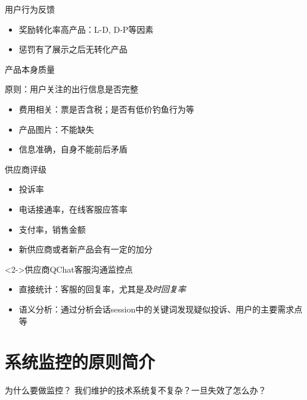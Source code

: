 \documentclass[handout]{beamer}
\begin{document}
\begin{CJK}{UTF8}{gbsn}
\begin{frame}{用户行为反馈}
  \begin{itemize}
  \item {奖励转化率高产品：L-D, D-P等因素}
  \item {惩罚有了展示之后无转化产品}
  \end{itemize}
\end{frame}

\begin{frame}{产品本身质量}
  \begin{block}{原则：用户关注的出行信息是否完整}
    \begin{itemize}
    \item {费用相关：票是否含税；是否有低价钓鱼行为等}
    \item {产品图片：不能缺失}
    \item {信息准确，自身不能前后矛盾}
    \end{itemize}
  \end{block}
  
\end{frame}

\begin{frame}{供应商评级}
  \begin{itemize}
  \item {投诉率}
  \item {电话接通率，在线客服应答率}
  \item {支付率，销售金额}
  \item {新供应商或者新产品会有一定的加分}
  \end {itemize}
  \begin{block}<2->{供应商QChat客服沟通监控点}
    \begin{itemize}
    \item {直接统计：客服的回复率，尤其是\emph{及时回复率}}
    \item {语义分析：通过分析会话session中的关键词发现疑似投诉、用户的主要需求点等}
    \end{itemize}
  \end{block}
\end{frame}


\section{系统监控的原则简介}

\begin{frame}{为什么要做监控？}
  我们维护的技术系统复不复杂？一旦失效了怎么办？
  \begin{thebibliography}{10}
    

\end{thebibliography}
\end{frame}
\end{CJK}
\end{document}
